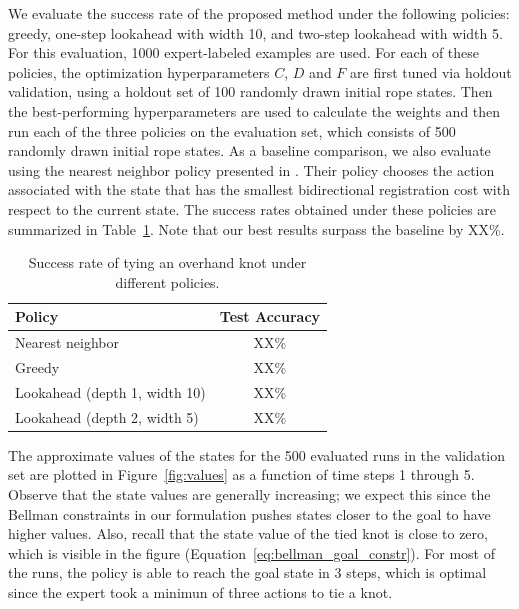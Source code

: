 We evaluate the success rate of the proposed method under the following policies: greedy, one-step lookahead with width 10, and two-step lookahead with width 5.
For this evaluation, 1000 expert-labeled examples are used.
For each of these policies, the optimization hyperparameters $C$, $D$ and $F$ are first tuned via holdout validation, using a holdout set of 100 randomly drawn initial rope states.
Then the best-performing hyperparameters are used to calculate the weights and then run each of the three policies on the evaluation set, which consists of 500 randomly drawn initial rope states.
As a baseline comparison, we also evaluate using the nearest neighbor policy presented in \citet{Schulmanetal_ISRR2013}.
Their policy chooses the action associated with the state that has the smallest bidirectional registration cost with respect to the current state.
The success rates obtained under these policies are summarized in Table~\ref{table:performance}. Note that our best results surpass the baseline by XX\%.

\begin{table}
  \centering
  \begin{tabular}{lc}
    \toprule
      Policy & Test Accuracy\\
    \midrule
      Nearest neighbor \cite{Schulmanetal_ISRR2013} & XX\% \\
    \midrule
      Greedy & XX\% \\
      Lookahead (depth 1, width 10) & XX\% \\
      Lookahead (depth 2, width 5) & XX\% \\
    \bottomrule
  \end{tabular}
  \caption{Success rate of tying an overhand knot under different policies.}
  \label{table:performance}
\end{table}

The approximate values of the states for the 500 evaluated runs in the validation set are plotted in Figure~\ref{fig:values} as a function of time steps 1 through 5.
Observe that the state values are generally increasing; we expect this since the Bellman constraints in our formulation pushes states closer to the goal to have higher values.
Also, recall that the state value of the tied knot is close to zero, which is visible in the figure (Equation~\ref{eq:bellman_goal_constr}).
For most of the runs, the policy is able to reach the goal state in 3 steps, which is optimal since the expert took a minimun of three actions to tie a knot.

